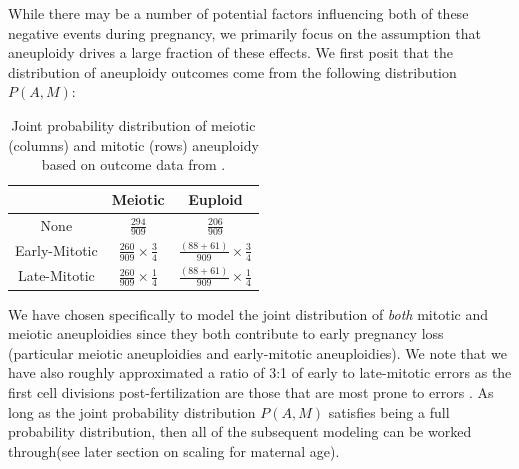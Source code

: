 \documentclass{article}
\begin{document}
While there may be a number of potential factors influencing both of these negative events during pregnancy, we primarily focus on the assumption that aneuploidy drives a large fraction of these effects. We first posit that the distribution of aneuploidy outcomes come from the following distribution $P(A,M)$: 


\begin{table}[H]
\begin{center}
	\begin{tabular}{ |c|c|c| } 
	 \hline
	  & Meiotic & Euploid  \\ 
	 \hline
	 None & $\frac{294}{909}$ & $\frac{206}{909}$ \\ 
	 \hline
	 Early-Mitotic & $\frac{260}{909}\times \frac{3}{4}$ & $\frac{(88 + 61)}{909}\times \frac{3}{4}$ \\
	 \hline
	 Late-Mitotic & $\frac{260}{909}\times \frac{1}{4}$ & $\frac{(88 + 61)}{909}\times \frac{1}{4}$\\
	 \hline
	\end{tabular}
	\caption{Joint probability distribution of meiotic (columns) and mitotic (rows) aneuploidy based on outcome data from \citep{McCoy2023-dg}.}
	\label{table:1}
	\end{center}
\end{table}

We have chosen specifically to model the joint distribution of \textit{both} mitotic and meiotic aneuploidies since they both contribute to early pregnancy loss (particular meiotic aneuploidies and early-mitotic aneuploidies). We note that we have also roughly approximated a ratio of 3:1 of early to late-mitotic errors as the first cell divisions post-fertilization are those that are most prone to errors \citep{Currie2022-wp}. As long as the joint probability distribution $P(A,M)$ satisfies being a full probability distribution, then all of the subsequent modeling can be worked through(see later section on scaling for maternal age). 
\end{document}
